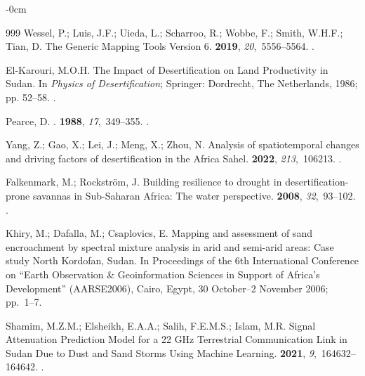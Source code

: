 \documentclass[jimaging,article,accept,pdftex,moreauthors]{Definitions/mdpi}
\begin{document}
\begin{adjustwidth}{-\extralength}{0cm}
\begin{thebibliography}{999}
Wessel, P.; Luis, J.F.; Uieda, L.; Scharroo, R.; Wobbe, F.; Smith, W.H.F.;
  Tian, D.
\newblock The Generic Mapping Tools Version 6.
 {\bf 2019}, {\em
  20},~5556--5564.
.

El-Karouri, M.O.H. The Impact of Desertification on Land Productivity in
  Sudan.
\newblock In {\em Physics of Desertification}; Springer: Dordrecht, The Netherlands, 1986; pp. 52--58.
.

Pearce, D.
.
 {\bf 1988}, {\em 17},~349--355.
.

Yang, Z.; Gao, X.; Lei, J.; Meng, X.; Zhou, N.
\newblock Analysis of spatiotemporal changes and driving factors of
  desertification in the Africa Sahel.
 {\bf 2022}, {\em 213},~106213.
.

Falkenmark, M.; Rockström, J.
\newblock Building resilience to drought in desertification-prone savannas in
  Sub-Saharan Africa: The water perspective.
 {\bf 2008}, {\em 32},~93--102.
.

Khiry, M.; Dafalla, M.; Csaplovics, E.
\newblock Mapping and assessment of sand encroachment by spectral mixture
  analysis in arid and semi-arid areas: Case study North Kordofan, Sudan.
\newblock In Proceedings of the 6th International Conference
  on ``Earth Observation \& Geoinformation Sciences in Support of Africa’s
  Development'' (AARSE2006), Cairo, Egypt, 30 October--2 November 2006; pp.~1--7.

Shamim, M.Z.M.; Elsheikh, E.A.A.; Salih, F.E.M.S.; Islam, M.R.
\newblock Signal Attenuation Prediction Model for a 22 GHz Terrestrial
  Communication Link in Sudan Due to Dust and Sand Storms Using Machine
  Learning.
 {\bf 2021}, {\em 9},~164632--164642.
.


\end{thebibliography}
\end{adjustwidth}
\end{document}
